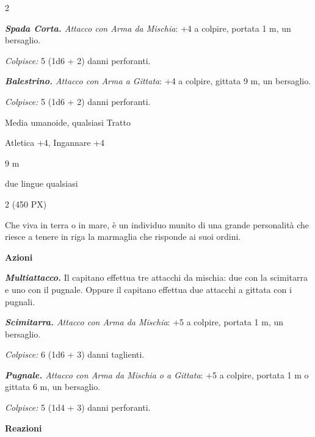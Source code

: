 \begin{multicols}{2}
{\emph{\textbf{Spada Corta.} Attacco con Arma da Mischia}: +4 a colpire, portata 1 m, un bersaglio.

\emph{Colpisce:} 5 (1d6 + 2) danni perforanti.

\emph{\textbf{Balestrino.} Attacco con Arma a Gittata}: +4 a colpire, gittata 9 m, un bersaglio.

\emph{Colpisce:} 5 (1d6 + 2) danni perforanti.

\begin{description}[noitemsep, topsep=0pt, parsep=0pt, partopsep=0pt, itemsep=1pt, leftmargin=2.35cm,  labelwidth=2.2cm, itemindent=0cm, listparindent=0pt] %
\setlength{\baselineskip}{10pt}
\item[\textbf{Taglia/Tipo}] Media umanoide, qualsiasi Tratto
\item[\textbf{Caratt.}] 
\item[\textbf{Punti Ferita}] 
\item[\textbf{Comp.}] Atletica +4, Ingannare +4
\item[\textbf{Tiri Salvez.}] 
\item[\textbf{Movimento}] 9 m
\item[\textbf{Linguaggi}] due lingue qualsiasi
\item[\textbf{Sfida}] 2 (450 PX)
\end{description}
\smallskip

Che viva in terra o in mare, è un individuo munito di una grande personalità che riesce a tenere in riga la marmaglia che risponde ai suoi ordini.

\textbf{Azioni}

\emph{\textbf{Multiattacco.}} Il capitano effettua tre attacchi da mischia: due con la scimitarra e uno con il pugnale. Oppure il capitano effettua due attacchi a gittata con i pugnali.

\emph{\textbf{Scimitarra.} Attacco con Arma da Mischia}: +5 a colpire, portata 1 m, un bersaglio.

\emph{Colpisce:} 6 (1d6 + 3) danni taglienti.

\emph{\textbf{Pugnale.} Attacco con Arma da Mischia o a Gittata}: +5 a colpire, portata 1 m o gittata 6 m, un bersaglio.

\emph{Colpisce:} 5 (1d4 + 3) danni perforanti.

\textbf{Reazioni}

}
\end{multicols}
